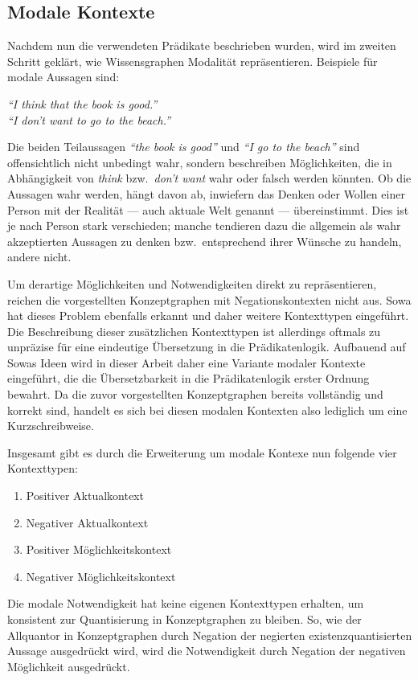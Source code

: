 \subsection{Modale Kontexte}%
\label{sec:text2kg:ontology:modal}

Nachdem nun die verwendeten Prädikate beschrieben wurden, wird im zweiten Schritt geklärt, wie Wissensgraphen Modalität repräsentieren.
Beispiele für modale Aussagen sind:
\begin{center}
	\textit{``I {\color{blau}think} that {\color{rot}the book is good}.''}\\
	\textit{``{\color{rot}I} {\color{blau}don't want} to {\color{rot}go to the beach}.''}
\end{center}
Die beiden Teilaussagen \textit{\color{rot}``the book is good''} und \textit{\color{rot}``I go to the beach''} sind offensichtlich nicht unbedingt wahr, sondern beschreiben Möglichkeiten, die in Abhängigkeit von \textit{\color{blau}think} bzw.\ \textit{\color{blau}don't want} wahr oder falsch werden könnten.
Ob die Aussagen wahr werden, hängt davon ab, inwiefern das Denken oder Wollen einer Person mit der Realität --- auch aktuale Welt genannt --- übereinstimmt.
Dies ist je nach Person stark verschieden; manche tendieren dazu die allgemein als wahr akzeptierten Aussagen zu denken bzw.\ entsprechend ihrer Wünsche zu handeln, andere nicht.

Um derartige Möglichkeiten und Notwendigkeiten direkt zu repräsentieren, reichen die vorgestellten Konzeptgraphen mit Negationskontexten nicht aus.
Sowa hat dieses Problem ebenfalls erkannt und daher weitere Kontexttypen eingeführt.
Die Beschreibung dieser zusätzlichen Kontexttypen ist allerdings oftmals zu unpräzise für eine eindeutige Übersetzung in die Prädikatenlogik.
Aufbauend auf Sowas Ideen wird in dieser Arbeit daher eine Variante modaler Kontexte eingeführt, die die Übersetzbarkeit in die Prädikatenlogik erster Ordnung bewahrt.
Da die zuvor vorgestellten Konzeptgraphen bereits vollständig und korrekt sind, handelt es sich bei diesen modalen Kontexten also lediglich um eine Kurzschreibweise.

Insgesamt gibt es durch die Erweiterung um modale Kontexe nun folgende vier Kontexttypen:
\begin{multicols}{2}
	\flushleft\begin{enumerate}
		\item Positiver Aktualkontext
		\item Negativer Aktualkontext
		\item Positiver Möglichkeitskontext
		\item Negativer Möglichkeitskontext
	\end{enumerate}
\end{multicols}
Die modale Notwendigkeit hat keine eigenen Kontexttypen erhalten, um konsistent zur Quantisierung in Konzeptgraphen zu bleiben.
So, wie der Allquantor in Konzeptgraphen durch Negation der negierten existenzquantisierten Aussage ausgedrückt wird, wird die Notwendigkeit durch Negation der negativen Möglichkeit ausgedrückt.

